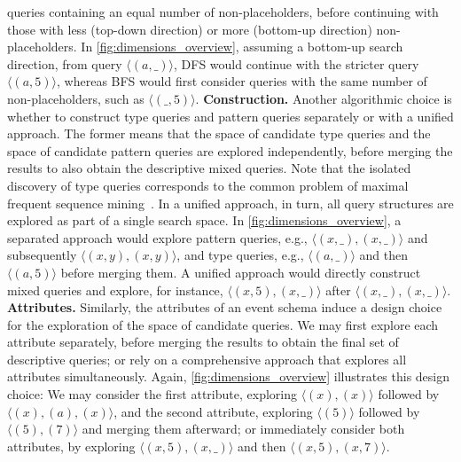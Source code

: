 queries containing an equal number of non-placeholders, before continuing with
those with less (top-down
direction) or more (bottom-up
direction) non-placeholders. In \autoref{fig:dimensions_overview},  assuming a
bottom-up
search direction, from query
$\langle (a,\_) \rangle$, DFS would continue with the stricter query
$\langle (a,5) \rangle$, whereas BFS would first consider queries with the
same number of non-placeholders, such as $\langle (\_,5) \rangle$.
\textbf{Construction.}
Another algorithmic choice is whether to construct type queries and pattern
queries separately or with a unified approach. The former means that the
space of candidate type queries and the space of candidate pattern
queries are explored independently, before merging the results to also
obtain the descriptive mixed queries. Note that the isolated discovery of
type queries corresponds to the common problem of maximal frequent sequence
mining~\cite{10.1007/978-3-319-06483-3_8,10.1007/978-3-642-53914-5_15,10.1145/2757217}.
In a unified approach, in turn, all query structures are explored as part of
a single search space. In \autoref{fig:dimensions_overview}, a separated
approach would explore pattern queries, e.g., $\langle (x,\_),(x,\_) \rangle$
and subsequently $\langle (x,y),(x,y) \rangle$, and type queries, e.g.,
$\langle (a,\_)\rangle$ and then $\langle(a,5) \rangle$ before merging them. A
unified approach would directly construct mixed queries and explore, for
instance, $\langle (x,5),(x,\_)\rangle$ after $\langle (x,\_),(x,\_)\rangle$.
\textbf{Attributes.}
Similarly, the attributes of an event schema induce a
design choice for the exploration of the space of candidate
queries. We may first
explore each attribute separately, before merging the
results to obtain the final set of descriptive queries; or rely on a
comprehensive approach that explores all attributes
simultaneously. Again, \autoref{fig:dimensions_overview} illustrates this
design choice: We may consider the first attribute, exploring $\langle (x),(x)
\rangle$ followed by $\langle (x),(a),(x) \rangle$, and the second attribute,
exploring $\langle (5) \rangle$ followed by $\langle (5),(7) \rangle$ and merging them afterward;
or immediately consider both attributes, by exploring $\langle
(x,5),(x,\_) \rangle$ and then $\langle (x,5),(x,7) \rangle$.
